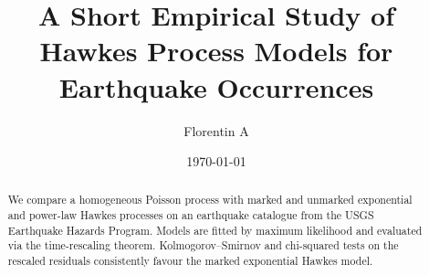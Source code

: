 \documentclass[11pt,a4paper]{article}
\title{A Short Empirical Study of Hawkes Process Models for Earthquake Occurrences}
\author{Florentin A\bsc{CKER}}
\date{\today}
\begin{document}
\maketitle

\begin{abstract}
We compare a homogeneous Poisson process with marked and unmarked exponential
and power-law Hawkes processes on an earthquake catalogue from the USGS
Earthquake Hazards Program. Models are fitted by maximum likelihood and
evaluated via the time-rescaling theorem. Kolmogorov--Smirnov and chi-squared
tests on the rescaled residuals consistently favour the marked exponential
Hawkes model.
\end{abstract}








\end{document}
